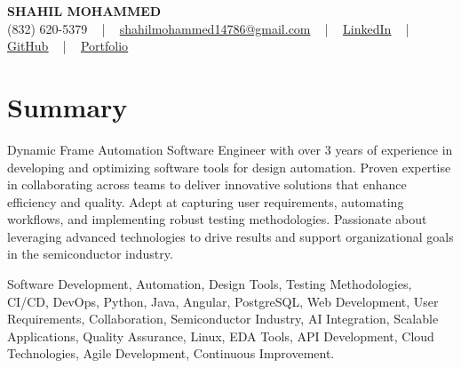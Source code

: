 \documentclass[letterpaper,10pt]{article}
\begin{document}
\begin{center}
    {\fontsize{14pt}{12pt}\selectfont \textbf{\MakeUppercase{Shahil Mohammed}}}\\ \vspace{2pt}
    \fontsize{10pt}{12pt}\selectfont (832) 620-5379 ~ | ~ \href{mailto:shahilmohammed14786@gmail.com}{shahilmohammed14786@gmail.com} ~ | ~  
    \href{https://www.linkedin.com/in/shahil-mohammed-9652931a1/}{\color{blue}\underline{LinkedIn}}  ~ | ~ 
    \href{https://github.com/freakbeast14}{\color{blue}\underline{GitHub}} ~ | ~ 
    \href{https://shahil-mohammed.netlify.app/}{\color{blue}\underline{Portfolio}}
    \vspace{-8pt}
\end{center}

\section{Summary}
\vspace{-2pt}\fontsize{8pt}{9pt}\selectfont
Dynamic Frame Automation Software Engineer with over 3 years of experience in developing and optimizing software tools for design automation. Proven expertise in collaborating across teams to deliver innovative solutions that enhance efficiency and quality. Adept at capturing user requirements, automating workflows, and implementing robust testing methodologies. Passionate about leveraging advanced technologies to drive results and support organizational goals in the semiconductor industry.
 \vspace{-5pt}
 
{\fontsize{1pt}{1pt}\selectfont\color{white}
Software Development, Automation, Design Tools, Testing Methodologies, CI/CD, DevOps, Python, Java, Angular, PostgreSQL, Web Development, User Requirements, Collaboration, Semiconductor Industry, AI Integration, Scalable Applications, Quality Assurance, Linux, EDA Tools, API Development, Cloud Technologies, Agile Development, Continuous Improvement.
}
\vspace{-8pt}

\vspace{-2pt}
\end{document}
